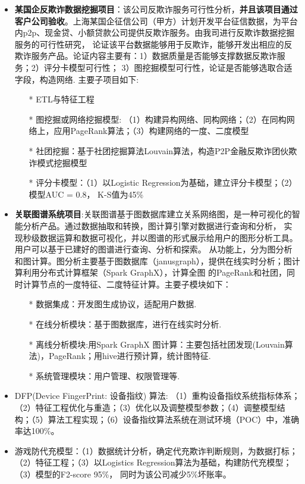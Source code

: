 \documentclass{resume}
\begin{document}
\begin{onehalfspacing}
\begin{itemize}
  \item \textbf{某国企反欺诈数据挖掘项目}：该公司反欺诈服务可行性分析，\textbf{并且该项目通过客户公司验收}。上海某国企征信公司（甲方）计划开发平台征信数据，为平台内p2p、现金贷、小额贷款公司提供反欺诈服务。由我司进行反欺诈数据挖掘服务的可行性研究，
  论证该平台数据能够用于反欺诈，能够开发出相应的反欺诈服务产品。论证内容主要有：1）数据质量是否能够支撑数据反欺诈服务；2）评分卡模型可行性；
  3）图挖掘模型可行性，论证是否能够选取合适字段，构造网络. 主要子项目如下:
  \begin{itemize}
     \item[*] ETL与特征工程
     \item[*] 图挖掘或网络挖掘模型: （1）构建异构网络、同构网络；（2）在同构网络上，应用PageRank算法；（3）构建网络的一度、二度模型
     \item[*] 社团挖掘：基于社团挖掘算法Louvain算法，构造P2P金融反欺诈团伙欺诈模式挖掘模型    
     \item[*] 评分卡模型：（1）以Logistic Regression为基础，建立评分卡模型；（2）模型AUC = 0.8， K-S值为45\%
  \end{itemize}	
  \item {\textbf{关联图谱系统项目}}:关联图谱基于图数据库建立关系网络图，是一种可视化的智能分析产品。通过数据抽取和转换，图计算引擎对数据进行查询和分析，
实现秒级数据运算和数据可视化，并以图谱的形式展示给用户的图形分析工具。用户可以基于已建好的图谱进行查询、分析和探索。
从功能上，分为图分析和图计算。图分析主要基于图数据库（janusgraph），提供在线实时分析；图计算利用分布式计算框架（Spark GraphX），计算全图
的PageRank和社团，同时计算节点的一度特征、二度特征计算。主要子模块如下：
\begin{itemize}
  \item[*] 数据集成：开发图生成协议，适配用户数据.
  \item[*] 在线分析模块：基于图数据库，进行在线实时分析.
  \item[*] 离线分析模块:用Spark GraphX 图计算：主要包括社团发现(Louvain算法)，PageRank；用hive进行预计算，统计图特征.    
  \item[*] 系统管理模块：用户管理、权限管理等.
\end{itemize}
  \item DFP(Device FingerPrint: 设备指纹) 算法: （1）重构设备指纹系统指标体系；（2）特征工程优化与重造；（3）优化以及调整模型参数；（4）调整模型结构；（5）算法工程实现；（6）设备指纹算法系统在测试环境（POC）中，准确率达100\%。
  \item 游戏防代充模型：（1）数据统计分析，确定代充欺诈判断规则，为数据打标；（2）特征工程；（3）以Logistics Regression算法为基础，构建防代充模型；（3）模型的F2-score 95\%， 同时为该公司减少5\%坏账率。
\end{itemize}
\end{onehalfspacing}
\end{document}
